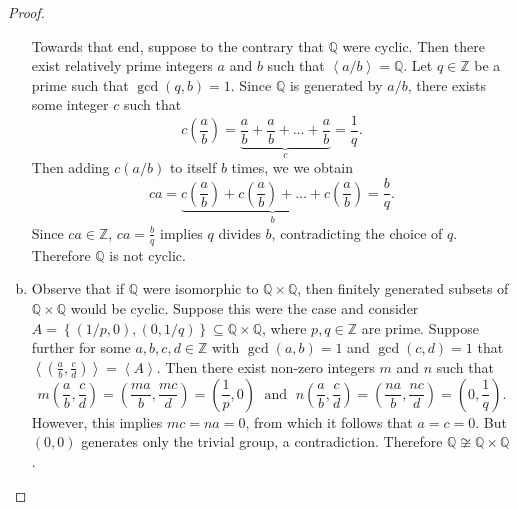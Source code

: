 \documentclass[10pt]{amsart}
\begin{document}
\begin{thm}
\begin{proof}
\begin{enumerate}[(a)]
      Towards that end, suppose to the contrary that $\mathbb{Q}$ were cyclic.
      Then there exist relatively prime integers $a$ and $b$ such that $\left<a/b\right> = \mathbb{Q}$.
      Let $q \in \mathbb{Z}$ be a prime such that $\gcd(q,b) = 1$.
      Since $\mathbb{Q}$ is generated by $a/b$, there exists some integer $c$ such that 
      $$c\left(\frac{a}{b}\right) = \underbrace{\frac{a}{b} + \frac{a}{b} + \ldots + \frac{a}{b}}_c = \frac{1}{q}.$$
      Then adding $c(a/b)$ to itself $b$ times, we we obtain 
      $$ca = \underbrace{c\left(\frac{a}{b}\right) +  c\left(\frac{a}{b}\right) + \ldots + c\left(\frac{a}{b}\right)}_b =  \frac{b}{q}.$$
      Since $ca \in \mathbb{Z}$, $ca = \frac{b}{q}$ implies $q$ divides $b$, contradicting the choice of $q$.
      Therefore $\mathbb{Q}$ is not cyclic.
    \item
      Observe that if $\mathbb{Q}$ were isomorphic to $\mathbb{Q} \times \mathbb{Q}$, then finitely generated subsets of $\mathbb{Q} \times \mathbb{Q}$ would be cyclic.
      Suppose this were the case and consider $A = \left\{(1/p, 0), (0, 1/q)\right\} \subseteq \mathbb{Q} \times \mathbb{Q}$, where $p, q \in \mathbb{Z}$ are prime.
      Suppose further for some $a,b,c,d \in \mathbb{Z}$ with $\gcd(a,b) = 1$ and $\gcd(c,d) = 1$ that $\left<(\frac{a}{b}, \frac{c}{d})\right> = \left<A\right>$.
      Then there exist non-zero integers $m$ and $n$ such that 
      $$m\left(\frac{a}{b}, \frac{c}{d}\right) = \left(\frac{ma}{b}, \frac{mc}{d}\right) = \left(\frac{1}{p},0\right) \;\text{ and }\; n\left(\frac{a}{b}, \frac{c}{d}\right) = \left(\frac{na}{b}, \frac{nc}{d}\right) = \left(0,\frac{1}{q}\right).$$
      However, this implies $mc = na = 0$, from which it follows that $a = c = 0$.
      But $(0,0)$ generates only the trivial group, a contradiction.
      Therefore $\mathbb{Q} \not \cong \mathbb{Q} \times \mathbb{Q}$.
    \end{enumerate}
  \end{proof}
\end{thm}
\end{document}
